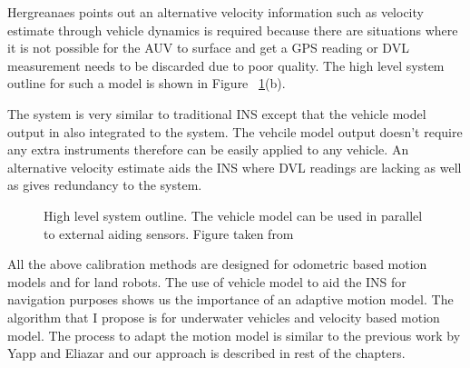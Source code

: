 \documentclass[12pt]{dalcsthesis}
\begin{document}
Hergreanaes points out an alternative velocity information such as velocity estimate through vehicle dynamics is required because there are situations where it is not possible for the AUV to surface and get a GPS reading or DVL measurement needs to be discarded due to poor quality. The high level system outline for such a model is shown in Figure ~\ref{fig-INS systems}(b).

The system is very similar to traditional INS except that the vehicle model output in also integrated to the system. The vehcile model output doesn't require any extra instruments therefore can be easily applied to any vehicle. An alternative velocity estimate aids the INS where DVL readings are lacking as well as gives redundancy to the system. 




\begin{figure}
  \centering
  \qquad
 
  \caption{\label{fig-INS systems}High level system outline. The vehicle model can be used in parallel to external aiding sensors. Figure taken from \cite{Hegrenæs2008}}
\end{figure}

All the above calibration methods are designed for odometric based motion models and for land robots. The use of vehicle model to aid the INS for navigation purposes shows us the importance of an adaptive motion model. The algorithm that I propose is for underwater vehicles and velocity based motion model. The process to adapt the motion model is similar to the previous work by Yapp and Eliazar and our approach is described in rest of the chapters.
\end{document}
